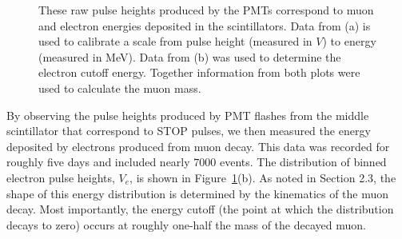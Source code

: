 \begin{figure}[htbp]
\begin{center}
\hspace{-1mm}
\vspace{-2mm}
\vspace{-2mm}
\caption{These raw pulse heights produced by the PMTs correspond to muon and electron energies deposited in the scintillators.  Data from (a) is used to calibrate a scale from pulse height (measured in $V$) to energy (measured in MeV).  Data from (b) was used to determine the electron cutoff energy.  Together information from both plots were used to calculate the muon mass.}
\label{fig:pulseheights}
\end{center}
\end{figure}


By observing the pulse heights produced by PMT flashes from the middle
scintillator that correspond to STOP pulses, we then measured the
energy deposited by electrons produced from muon decay.  This data was
recorded for roughly five days and included nearly $7000$ events.  The
distribution of binned electron pulse heights, $V_{e}$, is shown in
Figure~\ref{fig:pulseheights}(b).  As noted in Section 2.3, the shape of this energy
distribution is determined by the kinematics of the muon decay.  Most
importantly, the energy cutoff (the point at which the distribution
decays to zero) occurs at roughly one-half the mass of the decayed
muon.




